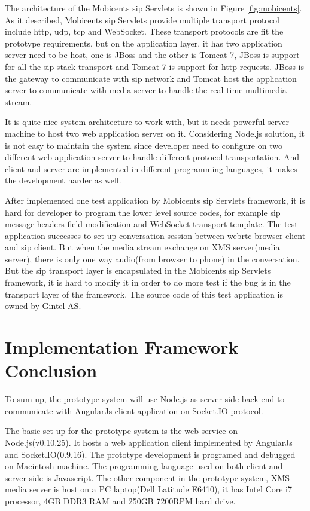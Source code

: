 \par The architecture of the Mobicents \gls{sip} Servlets is shown in Figure \ref{fig:mobicents}. As it described, Mobicents \gls{sip} Servlets provide multiple transport protocol include \gls{http}, \gls{udp}, \gls{tcp} and WebSocket. These transport protocols are fit the prototype requirements, but on the application layer, it has two application server need to be host, one is JBoss and the other is Tomcat 7, JBoss is support for all the \gls{sip} stack transport and Tomcat 7 is support for \gls{http} requests. JBoss is the gateway to communicate with \gls{sip} network and Tomcat host the application server to communicate with media server to handle the real-time multimedia stream.

\par It is quite nice system architecture to work with, but it needs powerful server machine to host two web application server on it. Considering Node.js solution, it is not easy to maintain the system since developer need to configure on two different web application server to handle different protocol transportation. And client and server are implemented in different programming languages, it makes the development harder as well.

\par After implemented one test application by Mobicents \gls{sip} Servlets framework, it is hard for developer to program the lower level source codes, for example \gls{sip} message headers field modification and WebSocket transport template. The test application successes to set up conversation session between \gls{webrtc} browser client and \gls{sip} client. But when the media stream exchange on XMS server(media server), there is only one way audio(from browser to phone) in the conversation. But the \gls{sip} transport layer is encapsulated in the Mobicents \gls{sip} Servlets framework, it is hard to modify it in order to do more test if the bug is in the transport layer of the framework. The source code of this test application is owned by Gintel AS.

\section{Implementation Framework Conclusion}

\noindent To sum up, the prototype system will use Node.js as server side back-end to communicate with AngularJs client application on Socket.IO protocol.

\par The basic set up for the prototype system is the web service on Node.js(v0.10.25). It hosts a web application client implemented by AngularJs and Socket.IO(0.9.16). The prototype development is programed and debugged on Macintosh machine. The programming language used on both client and server side is Javascript. The other component in the prototype system, XMS media server is host on a PC laptop(Dell Latitude E6410), it has Intel Core i7 processor, 4GB DDR3 RAM and 250GB 7200RPM hard drive.

